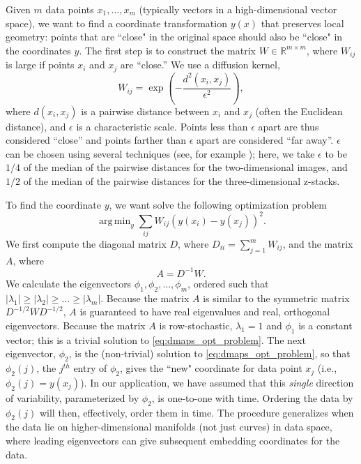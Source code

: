 \documentclass[10pt,twocolumn]{article}
\DeclareMathOperator*{\argmin}{arg\,min}
\begin{document}
Given $m$ data points $x_1, \dots, x_m$ (typically vectors in a high-dimensional vector space), we want to find a coordinate transformation $y(x)$ that preserves local geometry: points that are ``close" in the original space should also be ``close" in the coordinates $y$.
%
The first step is to construct the matrix $W \in \mathbb{R}^{m \times m}$, where $W_{ij}$ is large if points $x_i$ and $x_j$ are ``close.''
%
We use a diffusion kernel,
\begin{equation} \label{eq:dmaps_W}
W_{ij} = \exp \left( -\frac{d^2(x_i, x_j)}{\epsilon^2} \right),
\end{equation}
where $d(x_i, x_j)$ is a pairwise distance between $x_i$ and $x_j$ (often the Euclidean distance), and $\epsilon$ is a characteristic scale.
%
Points less than $\epsilon$ apart are thus considered ``close'' and points farther than $\epsilon$ apart are considered ``far away''.
%
$\epsilon$ can be chosen using several techniques (see, for example \citep{coifman2008graph, rohrdanz2011determination}); here, we take $\epsilon$ to be $1/4$ of the median of the pairwise distances for the two-dimensional images, and $1/2$ of the median of the pairwise distances for the three-dimensional z-stacks.

To find the coordinate $y$, we want solve the following optimization problem \citep{Belkin2003}
\begin{equation} \label{eq:dmaps_opt_problem}
\argmin_{y} \sum_{ij} W_{ij} (y(x_i) - y(x_j))^2.
\end{equation}
%
We first compute the diagonal matrix $D$, where $D_{ii} = \sum_{j=1}^{m} W_{ij}$, and the matrix $A$, where
\begin{equation} \label{eq:dmaps_A}
A = D^{-1} W.
\end{equation}
%
We calculate the eigenvectors $\phi_1, \phi_2, \dots, \phi_m$, ordered such that $|\lambda_1| \ge |\lambda_2| \ge \dots \ge |\lambda_m|$.
%
Because the matrix $A$ is similar to the symmetric matrix $D^{-1/2} W D^{-1/2}$, $A$ is guaranteed to have real eigenvalues and real, orthogonal eigenvectors.
%
Because the matrix $A$ is row-stochastic, $\lambda_1=1$ and $\phi_1$ is a constant vector; this is a trivial solution to \eqref{eq:dmaps_opt_problem}.
%
%
The next eigenvector, $\phi_2$, is the (non-trivial) solution to \eqref{eq:dmaps_opt_problem}, so that $\phi_2(j)$, the $j^{th}$ entry of $\phi_2$, gives the ``new" coordinate for data point $x_j$ (i.e., $\phi_2(j) = y(x_j)$).
%
In our application, we have assumed that this {\em single} direction of variability, parameterized by $\phi_2$, is one-to-one with time.
%
Ordering the data by $\phi_2(j)$ will then, effectively, order them in time.
%
The procedure generalizes when the data lie on higher-dimensional manifolds (not just curves) in data space, where leading eigenvectors can give subsequent embedding coordinates for the data.
%
\end{document}
